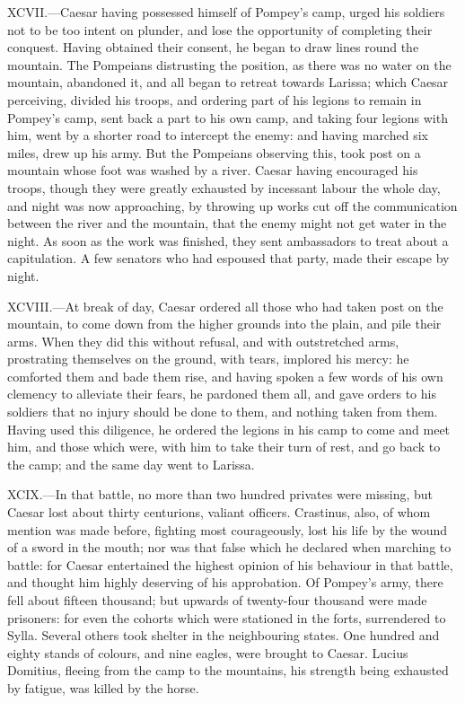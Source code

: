 XCVII.—Caesar having possessed himself of Pompey's camp, urged his
soldiers not to be too intent on plunder, and lose the opportunity of
completing their conquest. Having obtained their consent, he began to
draw lines round the mountain. The Pompeians distrusting the position,
as there was no water on the mountain, abandoned it, and all began to
retreat towards Larissa; which Caesar perceiving, divided his troops,
and ordering part of his legions to remain in Pompey's camp, sent back a
part to his own camp, and taking four legions with him, went by a
shorter road to intercept the enemy: and having marched six miles, drew
up his army. But the Pompeians observing this, took post on a mountain
whose foot was washed by a river. Caesar having encouraged his troops,
though they were greatly exhausted by incessant labour the whole day,
and night was now approaching, by throwing up works cut off the
communication between the river and the mountain, that the enemy might
not get water in the night. As soon as the work was finished, they sent
ambassadors to treat about a capitulation. A few senators who had
espoused that party, made their escape by night.

XCVIII.—At break of day, Caesar ordered all those who had taken post on
the mountain, to come down from the higher grounds into the plain, and
pile their arms. When they did this without refusal, and with
outstretched arms, prostrating themselves on the ground, with tears,
implored his mercy: he comforted them and bade them rise, and having
spoken a few words of his own clemency to alleviate their fears, he
pardoned them all, and gave orders to his soldiers that no injury should
be done to them, and nothing taken from them. Having used this
diligence, he ordered the legions in his camp to come and meet him, and
those which were, with him to take their turn of rest, and go back to
the camp; and the same day went to Larissa.

XCIX.—In that battle, no more than two hundred privates were missing,
but Caesar lost about thirty centurions, valiant officers. Crastinus,
also, of whom mention was made before, fighting most courageously, lost
his life by the wound of a sword in the mouth; nor was that false which
he declared when marching to battle: for Caesar entertained the highest
opinion of his behaviour in that battle, and thought him highly
deserving of his approbation. Of Pompey's army, there fell about fifteen
thousand; but upwards of twenty-four thousand were made prisoners: for
even the cohorts which were stationed in the forts, surrendered to
Sylla. Several others took shelter in the neighbouring states. One
hundred and eighty stands of colours, and nine eagles, were brought to
Caesar. Lucius Domitius, fleeing from the camp to the mountains, his
strength being exhausted by fatigue, was killed by the horse.

